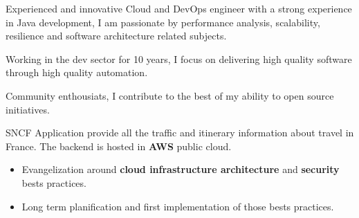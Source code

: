 \documentclass[10pt,a4paper,ragged2e]{altacv}
\begin{document}

\begin{fullwidth}
\makecvheader
\end{fullwidth}

	\quad Experienced and innovative Cloud and DevOps engineer with a strong experience in Java development, I am passionate by performance analysis, scalability, resilience and software architecture related subjects. 
	
	\medskip
	\quad Working in the dev sector for 10 years, I focus on delivering high quality software through high quality automation. 
	
	\medskip
	\quad Community enthousiats, I contribute to the best of my ability to open source initiatives.
	


\bigskip
{}
		
		SNCF Application provide all the traffic and itinerary information about travel in France. The backend is hosted in \textbf{AWS} public cloud.
		
		\medskip
		\begin{itemize}	
			\item Evangelization around \textbf{cloud infrastructure architecture} and \textbf{security} bests practices.
			\item Long term planification and first implementation of those bests practices.
		\end{itemize}
	\divider


\end{document}
